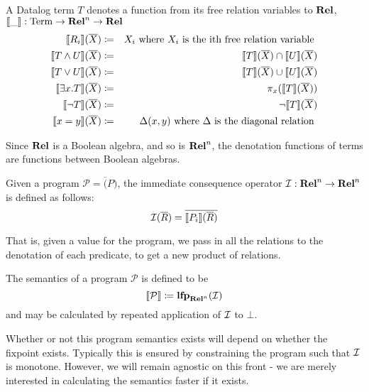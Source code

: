\begin{defn}
  A Datalog term $T$ denotes a function from its free relation variables to
  $\mathbf{Rel}$, $\llbracket \_ \rrbracket : \mathrm{Term} \rightarrow \mathbf{Rel}^n \rightarrow \mathbf{Rel}$
  \begin{eqnarray*}
    \llbracket R_i \rrbracket(\overline{X}) &\coloneqq& X_i \text{ where } X_i \text { is the ith free relation variable }\\
    \llbracket T \wedge U \rrbracket(\overline{X}) &\coloneqq& \llbracket T \rrbracket(\overline{X}) \cap  \llbracket U \rrbracket(\overline{X})\\
    \llbracket T \vee U \rrbracket(\overline{X}) &\coloneqq& \llbracket T \rrbracket(\overline{X}) \cup  \llbracket U \rrbracket(\overline{X})\\
    \llbracket \exists x. T \rrbracket(\overline{X}) &\coloneqq& \pi_x(\llbracket T \rrbracket(\overline{X}))\\
    \llbracket \neg T \rrbracket(\overline{X}) &\coloneqq& \neg \llbracket T \rrbracket(\overline{X})\\
    \llbracket x=y \rrbracket(\overline{X}) &\coloneqq& \Delta(x, y) \text{ where } \Delta \text{ is the diagonal relation }
  \end{eqnarray*}
\end{defn}

Since $\mathbf{Rel}$ is a Boolean algebra, and so is $\mathbf{Rel}^n$, the denotation
functions of terms are functions between Boolean algebras.

\begin{defn}
  Given a program $\mathcal{P} = \overline(P)$, the immediate consequence operator $\mathcal{I}: \mathbf{Rel}^n \rightarrow \mathbf{Rel}^n$ is defined as follows:
  $$\mathcal{I}(\overline{R}) = \overline{\llbracket P_i \rrbracket(\overline{R})}$$
\end{defn}

That is, given a value for the program, we pass in all the relations
to the denotation of each predicate, to get a new product of relations.

\begin{defn}
  The semantics of a program $\mathcal{P}$ is defined to be 
  $$\llbracket \mathcal{P} \rrbracket \coloneqq \textbf{lfp}_{\mathbf{Rel}^n}(\mathcal{I})$$
  and may be calculated by repeated application of $\mathcal{I}$ to $\bot$.
\end{defn}

Whether or not this program semantics exists will depend on whether the fixpoint
exists. Typically this is ensured by constraining the program such that $\mathcal{I}$
is monotone. However, we will remain agnostic on this front - we are merely
interested in calculating the semantics faster if it exists.

